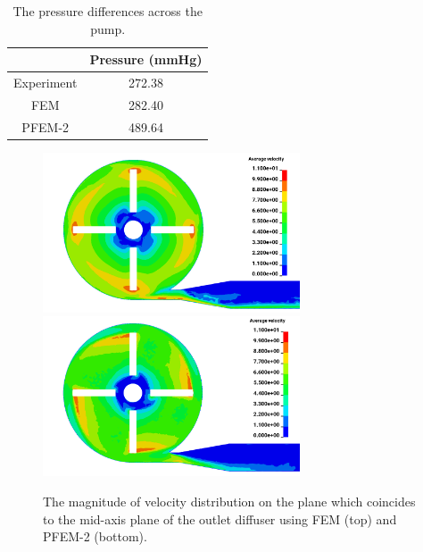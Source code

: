 \begin{table}[h]
\caption {The pressure differences across the pump.}\label{tab:pumppres} 
\centering
\begin{tabular}{|c|c|}
\hline
 & Pressure (mmHg) \\ \hline
Experiment \cite{mali_cfd}    & 272.38    \\ \hline
FEM    & 282.40             \\ \hline
PFEM-2    & 489.64          \\ \hline
\end{tabular}
\end{table}

\begin{figure}[htbp]
    \centering
    \includegraphics[width=3in]{imgs/nozzle_pump/pumpvel_fem.png}\\
    \vspace{.5cm}
    \includegraphics[width=3in]{imgs/nozzle_pump/pumpvel_pfem.png}
    \caption{The magnitude of velocity distribution on the plane which coincides to the mid-axis plane of the outlet diffuser using FEM (top) and PFEM-2 (bottom).}
    \label{fig:pumpvel}
\end{figure}

